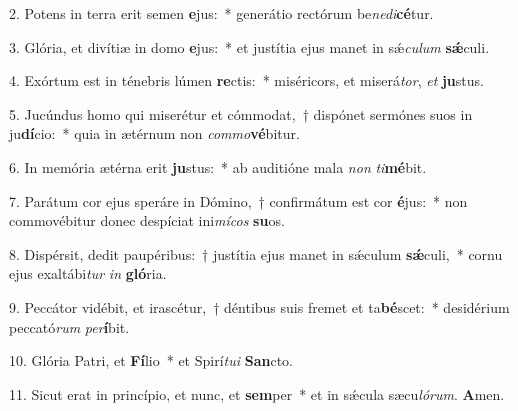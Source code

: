 \item 2. Potens in terra erit semen \textbf{e}jus:~* generátio rectórum be\textit{ne}\textit{di}\textbf{cé}tur.

\item 3. Glória, et divítiæ in domo \textbf{e}jus:~* et justítia ejus manet in sǽ\textit{cu}\textit{lum} \textbf{sǽ}culi.

\item 4. Exórtum est in ténebris lúmen \textbf{re}ctis:~* miséricors, et miserá\textit{tor}, \textit{et} \textbf{ju}stus.

\item 5. Jucúndus homo qui miserétur et cómmodat,~† dispónet sermónes suos in ju\textbf{dí}cio:~* quia in ætérnum non \textit{com}\textit{mo}\textbf{vé}bitur.

\item 6. In memória ætérna erit \textbf{ju}stus:~* ab auditióne mala \textit{non} \textit{ti}\textbf{mé}bit.

\item 7. Parátum cor ejus speráre in Dómino,~† confirmátum est cor \textbf{é}jus:~* non commovébitur donec despíciat ini\textit{mícos} \textbf{su}os.

\item 8. Dispérsit, dedit paupéribus:~† justítia ejus manet in sǽculum \textbf{sǽ}culi,~* cornu ejus exaltábi\textit{tur} \textit{in} \textbf{gló}ria.

\item 9. Peccátor vidébit, et irascétur,~† déntibus suis fremet et ta\textbf{bé}scet:~* desidérium peccató\textit{rum} \textit{per}\textbf{í}bit.

\item 10. Glória Patri, et \textbf{Fí}lio~* et Spirí\textit{tui} \textbf{San}cto.

\item 11. Sicut erat in princípio, et nunc, et \textbf{sem}per~* et in sǽcula sæcu\hspace{0.03em}\textit{lórum}. \textbf{A}men.
